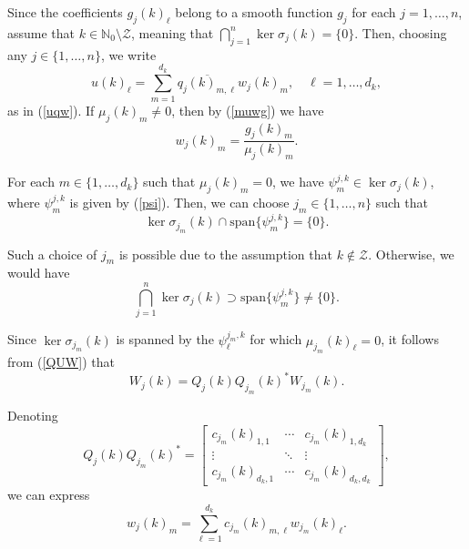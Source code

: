 \documentclass{amsart}
\theoremstyle{definition}
\theoremstyle{remark}
\numberwithin{equation}{section}
\begin{document}
	Since the coefficients $g_j(k)_\ell$ belong to a smooth function $g_j$ for each $j=1,\dots,n$, assume that $k\in\mathbb{N}_0\setminus\mathcal{Z}$, meaning that $\bigcap_{j=1}^n\ker\sigma_j(k)=\{0\}$. Then, choosing any $j\in\{1,\dots,n\}$, we write  
	\begin{equation*}
		\widehat{u}(k)_\ell = \sum_{m=1}^{d_k} \overline{q_{j}(k)_{m,\ell}}w_{j}(k)_{m},\quad\ell=1,\dots,d_k,
	\end{equation*}
	as in (\ref{uqw}). If $\mu_{j}(k)_m\neq 0$, then by (\ref{muwg}) we have  
	\begin{equation*}
		w_{j}(k)_m = \dfrac{g_{j}(k)_m}{\mu_{j}(k)_m}.
	\end{equation*}
	
	For each $m\in\{1,\dots,d_k\}$ such that $\mu_{j}(k)_m=0$, we have $\psi_{m}^{j,k}\in\ker\sigma_{j}(k)$, where $\psi_{m}^{j,k}$ is given by (\ref{psi}). Then, we can choose $j_m\in\{1,\dots,n\}$ such that  
	\begin{equation*}
		\ker\sigma_{j_m}(k)\cap \text{span}\{\psi_{m}^{j,k}\}=\{0\}.
	\end{equation*}
	
	Such a choice of $j_m$ is possible due to the assumption that $k\notin\mathcal{Z}$. Otherwise, we would have  
	\begin{equation*}
		\bigcap_{j=1}^n\ker\sigma_j(k)\supset \text{span}\{\psi_{m}^{j,k}\} \neq \{0\}.
	\end{equation*}
	
	Since $\ker\sigma_{j_m}(k)$ is spanned by the $\psi_{\ell}^{j_m,k}$ for which $\mu_{j_m}(k)_\ell=0$, it follows from (\ref{QUW}) that  
	\begin{equation*}
		W_j(k) = Q_j(k) Q_{j_m}(k)^* W_{j_m}(k).
	\end{equation*}
	
	Denoting  
	\begin{equation*}
		Q_j(k)Q_{j_m}(k)^* =  
		\begin{bmatrix}
			c_{j_m}(k)_{1,1} & \cdots & c_{j_m}(k)_{1,d_k}\\
			\vdots & \ddots & \vdots\\
			c_{j_m}(k)_{d_k,1} & \cdots & c_{j_m}(k)_{d_k,d_k}
		\end{bmatrix},
	\end{equation*}
	we can express  
	\begin{equation*}
		w_j(k)_m = \sum_{\ell=1}^{d_k} c_{j_m}(k)_{m,\ell} w_{j_m}(k)_\ell.
	\end{equation*}
	
\end{document}
